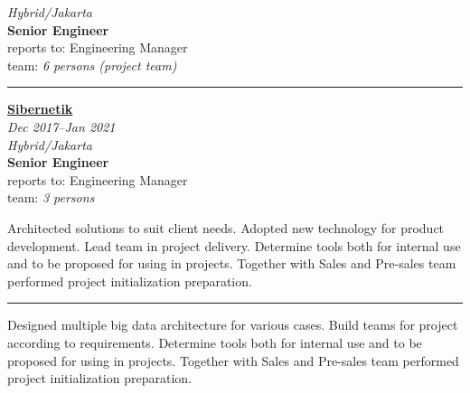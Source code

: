 \documentclass[12pt]{res} %
\begin{document}
\begin{resume}
\begin{minipage}{6cm}
	{\footnotesize{\sl Hybrid/Jakarta}} \\
	{\bf Senior Engineer} \\
	{\footnotesize reports to: Engineering Manager} \\
	{\footnotesize team: \emph{6 persons (project team)}}
\end{minipage}
\begin{center}
	\rule{0.5\textwidth}{.2pt}
\end{center}
\vspace{16pt} %
\begin{minipage}{6cm}
\begin{flushright}
	{\bf \href{https://sibernetik.co.id}{Sibernetik}} \\
	{\footnotesize{\sl Dec 2017--Jan 2021}}\\
	{\footnotesize{\sl Hybrid/Jakarta}}\\
	{\bf Senior Engineer} \\
	{\footnotesize reports to: Engineering Manager} \\
	{\footnotesize team: \emph{3 persons}}
\end{flushright}
\end{minipage}
\hspace{1cm}
\begin{minipage}{0.59\linewidth}
	Architected solutions to suit client needs. 
	Adopted new technology for product development. 
	Lead team in project delivery. 
	Determine tools both for internal use and to be proposed for using in projects.
	Together with Sales and Pre-sales team performed project initialization preparation.
\end{minipage}
\begin{center}
	\rule{0.5\textwidth}{.2pt}
\end{center}
\vspace{16pt} %
\begin{minipage}{0.59\linewidth}
	Designed multiple big data architecture for various cases. 
	Build teams for project according to requirements.
	Determine tools both for internal use and to be proposed for using in projects.
	Together with Sales and Pre-sales team performed project initialization preparation.
\end{minipage}
\hspace{1cm}
\begin{minipage}{6cm}

\end{minipage}
\end{resume}
\end{document}
